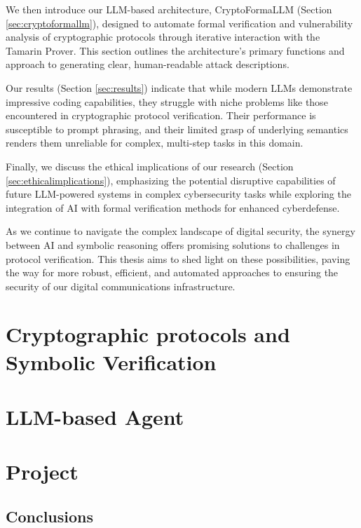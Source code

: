 \documentclass[a4paper,12pt,twoside,openany]{book}
\begin{document}
We then introduce our LLM-based architecture, CryptoFormaLLM (Section \ref{sec:cryptoformallm}), designed to automate formal verification and vulnerability analysis of cryptographic protocols through iterative interaction with the Tamarin Prover. This section outlines the architecture's primary functions and approach to generating clear, human-readable attack descriptions.

Our results (Section \ref{sec:results}) indicate that while modern LLMs demonstrate impressive coding capabilities, they struggle with niche problems like those encountered in cryptographic protocol verification. Their performance is susceptible to prompt phrasing, and their limited grasp of underlying semantics renders them unreliable for complex, multi-step tasks in this domain.

Finally, we discuss the ethical implications of our research (Section \ref{sec:ethicalimplications}), emphasizing the potential disruptive capabilities of future LLM-powered systems in complex cybersecurity tasks while exploring the integration of AI with formal verification methods for enhanced cyberdefense.

As we continue to navigate the complex landscape of digital security, the synergy between AI and symbolic reasoning offers promising solutions to challenges in protocol verification. This thesis aims to shed light on these possibilities, paving the way for more robust, efficient, and automated approaches to ensuring the security of our digital communications infrastructure.
\chapter{Cryptographic protocols and Symbolic Verification}
\label{chap:protocol_tamarin}


\chapter{LLM-based Agent}
\label{chap:llm_agent}


\chapter{Project}
\label{chap:project}


\section*{Conclusions}
\end{document}
